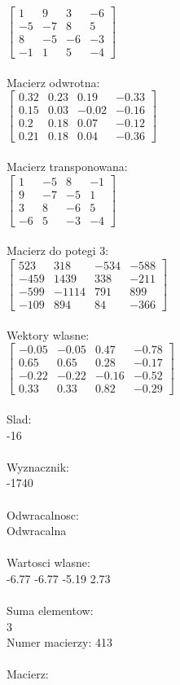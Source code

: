 \documentclass[a4paper,12pt]{article}
\begin{document}
$\begin{bmatrix} 1&9&3&-6\\-5&-7&8&5\\8&-5&-6&-3\\-1&1&5&-4 \end{bmatrix}$
\\
\\
Macierz odwrotna:\\

$\begin{bmatrix} 0.32&0.23&0.19&-0.33\\0.15&0.03&-0.02&-0.16\\0.2&0.18&0.07&-0.12\\0.21&0.18&0.04&-0.36 \end{bmatrix}$
\\
\\
Macierz transponowana:\\

$\begin{bmatrix} 1&-5&8&-1\\9&-7&-5&1\\3&8&-6&5\\-6&5&-3&-4 \end{bmatrix}$
\\
\\
Macierz do potegi 3:\\

$\begin{bmatrix} 523&318&-534&-588\\-459&1439&338&-211\\-599&-1114&791&899\\-109&894&84&-366 \end{bmatrix}$
\\
\\
Wektory wlasne:\\

$\begin{bmatrix} -0.05&-0.05&0.47&-0.78\\0.65&0.65&0.28&-0.17\\-0.22&-0.22&-0.16&-0.52\\0.33&0.33&0.82&-0.29 \end{bmatrix}$
\\
\\
Slad:\\
-16
\\
\\
Wyznacznik:\\
-1740
\\
\\
Odwracalnosc:\\
Odwracalna
\\
\\
Wartosci wlasne:\\
-6.77 -6.77 -5.19 2.73
\\
\\
Suma elementow:\\
3
\\
\newpage
Numer macierzy:
413
\\
\\
Macierz:\\
\end{document}

